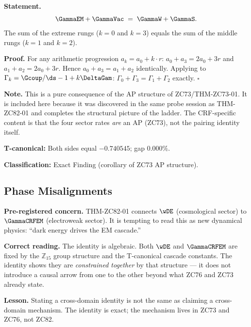 \documentclass[12pt, a4paper]{article}
\begin{document}
\begin{derivedbox}[title={FIND-ZC82-02: AP Pairing Identity
  ($R_0$, Exact)}]

\textbf{Statement.}
\begin{equation}
  \GammaEM + \GammaVac \;=\; \GammaW + \GammaS.
  \label{eq:ap-pair}
\end{equation}
The sum of the extreme rungs ($k=0$ and $k=3$) equals the
sum of the middle rungs ($k=1$ and $k=2$).

\textbf{Proof.}
For any arithmetic progression $a_k = a_0 + k\cdot r$:
$a_0 + a_3 = 2a_0 + 3r$ and $a_1 + a_2 = 2a_0 + 3r$.
Hence $a_0 + a_3 = a_1 + a_2$ identically.
Applying to $\Gamma_k = \Gcoup/\ds - 1 + k\DeltaGam$:
$\Gamma_0 + \Gamma_3 = \Gamma_1 + \Gamma_2$ exactly.
\hfill$\square$

\textbf{Note.}
This is a pure consequence of the AP structure of
ZC73/THM-ZC73-01. It is included here because it was
discovered in the same probe session as THM-ZC82-01 and
completes the structural picture of the ladder.
The CRF-specific content is that the four sector rates
\emph{are} an AP (ZC73), not the pairing identity itself.

\textbf{T-canonical:} Both sides equal $-0.740545$; gap
$0.000\%$.

\textbf{Classification:} Exact Finding (corollary of ZC73 AP structure).
\end{derivedbox}

\subsection{Phase Misalignments}
\label{sec:pm}

\begin{openqbox}[title={PM-ZC82-SCOPE-01: Risk of Over-Statement
  in Physical Reading (pre-registered)
  (pattern: scope creep)}]

\textbf{Pre-registered concern.}
THM-ZC82-01 connects $\wDE$ (cosmological sector) to
$\GammaCRFEM$ (electroweak sector). It is tempting to read this
as new dynamical physics: ``dark energy drives the EM cascade.''

\textbf{Correct reading.}
The identity is algebraic. Both $\wDE$ and $\GammaCRFEM$ are
fixed by the $\mathbb{Z}_{15}$ group structure and the
T-canonical cascade constants. The identity shows they are
\emph{constrained together} by that structure --- it does not
introduce a causal arrow from one to the other beyond what
ZC76 and ZC73 already state.

\textbf{Lesson.}
Stating a cross-domain identity is not the same as claiming
a cross-domain mechanism. The identity is exact; the
mechanism lives in ZC73 and ZC76, not ZC82.
\end{openqbox}
\end{document}
